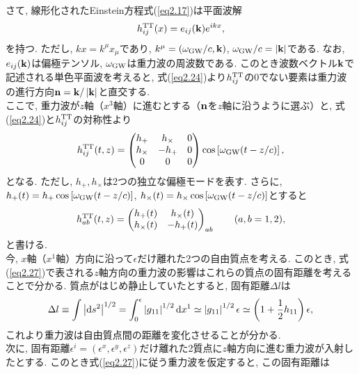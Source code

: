 \quad さて, 線形化されたEinstein方程式(\ref{eq2.17})は平面波解
\begin{equation}
h_{ij}^{\rm TT}(x)=e_{ij}({\bf k})e^{ikx},
\end{equation}
を持つ. ただし, $kx=k^{\mu}x_{\mu}$であり, $k^{\mu}=(\omega_{\rm GW}/c,{\bf k})$, $\omega_{\rm GW}/c=\left|{\bf k}\right|$である. なお, $e_{ij}({\bf k})$は偏極テンソル, $\omega_{\rm GW}$は重力波の周波数である. このとき波数ベクトル${\bf k}$で記述される単色平面波を考えると, 式(\ref{eq2.24})より$h_{ij}^{\rm TT}$の0でない要素は重力波の進行方向${\bf n}={\bf k}/\left|{\bf k}\right|$と直交する. \\
\quad ここで, 重力波が$z$軸（$x^{3}$軸）に進むとする（${\bf n}$を$z$軸に沿うように選ぶ）と, 式(\ref{eq2.24})と$h_{ij}^{\rm TT}$の対称性より
\begin{equation}
h_{ij}^{\rm TT}(t,z)=
\begin{pmatrix}
h_{+} & h_{\times} & 0 \\
h_{\times} & -h_{+} & 0 \\
0 & 0 & 0
\end{pmatrix}
\cos\left[\omega_{\rm GW}(t-z/c)\right],
\end{equation}
となる. ただし, $h_{+},h_{\times}$は2つの独立な偏極モードを表す. さらに, $h_{+}(t)=h_{+}\cos\left[\omega_{\rm GW}(t-z/c)\right]$, $h_{\times}(t)=h_{\times}\cos\left[\omega_{\rm GW}(t-z/c)\right]$とすると
\begin{equation}
h_{ab}^{\rm TT}(t,z)=
\begin{pmatrix}
h_{+}(t) & h_{\times}(t) \\
h_{\times}(t) & -h_{+}(t)
\end{pmatrix}
_{ab}\qquad (a,b=1,2),
\label{eq2.27}
\end{equation}
と書ける. \\
\quad 今, $x$軸（$x^{1}$軸）方向に沿って$\epsilon$だけ離れた2つの自由質点を考える. このとき, 式(\ref{eq2.27})で表される$z$軸方向の重力波の影響はこれらの質点の固有距離を考えることで分かる. 質点がはじめ静止していたとすると, 固有距離$\Delta l$は
\begin{equation}
\Delta l\equiv\int\left|{\rm d}s^2\right|^{1/2}=\int_0^{\epsilon}\left|g_{11}\right|^{1/2}{\rm d}x^1\simeq\left|g_{11}\right|^{1/2}\epsilon\simeq\left(1+\frac{1}{2}h_{11}\right)\epsilon,
\end{equation}
これより重力波は自由質点間の距離を変化させることが分かる. \\
\quad 次に, 固有距離$\epsilon^i=(\epsilon^x,\epsilon^y,\epsilon^z)$だけ離れた2質点に$z$軸方向に進む重力波が入射したとする. このとき式(\ref{eq2.27})に従う重力波を仮定すると, この固有距離は
